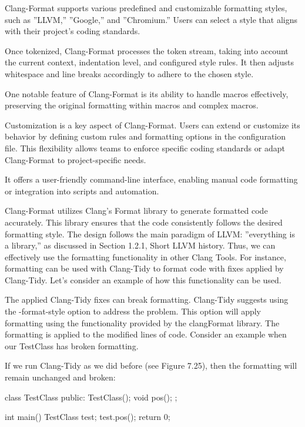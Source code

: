 Clang-Format supports various predefined and customizable formatting styles, such as ”LLVM,” ”Google,” and ”Chromium.” Users can select a style that aligns with their project’s coding standards.

Once tokenized, Clang-Format processes the token stream, taking into account the current context, indentation level, and configured style rules. It then adjusts whitespace and line breaks accordingly to adhere to the chosen style.

One notable feature of Clang-Format is its ability to handle macros effectively, preserving the original formatting within macros and complex macros.

Customization is a key aspect of Clang-Format. Users can extend or customize its behavior by defining custom rules and formatting options in the configuration file. This flexibility allows teams to enforce specific coding standards or adapt Clang-Format to project-specific needs.

It offers a user-friendly command-line interface, enabling manual code formatting or integration into scripts and automation.

Clang-Format utilizes Clang’s Format library to generate formatted code accurately. This library ensures that the code consistently follows the desired formatting style. The design follows the main paradigm of LLVM: ”everything is a library,” as discussed in Section 1.2.1, Short LLVM history. Thus, we can effectively use the formatting functionality in other Clang Tools. For instance, formatting can be used with Clang-Tidy to format code with fixes applied by Clang-Tidy. Let’s consider an example of how this functionality can be used.


The applied Clang-Tidy fixes can break formatting. Clang-Tidy suggests using the -format-style option to address the problem. This option will apply formatting using the functionality provided by the clangFormat library. The formatting is applied to the modified lines of code. Consider an example when our TestClass has broken formatting.

If we run Clang-Tidy as we did before (see Figure 7.25), then the formatting will remain unchanged and broken:

\begin{cpp}
class TestClass {
public:
  TestClass(){};
  void pos(){};
};

int main() {
  TestClass test;
  test.pos();
  return 0;
}
\end{cpp}

